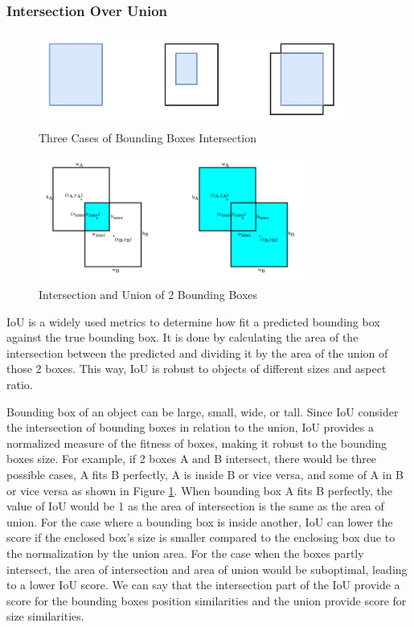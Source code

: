   \subsubsection{Intersection Over Union}
   \begin{figure}[p]
        \centering
        \includegraphics[width=0.9\textwidth]{figures/iou-intersect.png}
        \caption{Three Cases of Bounding Boxes Intersection}
        \label{fig:intersections-iou}
    \end{figure}
    \begin{figure}[p]
        \centering
        \includegraphics[width=0.8\textwidth]{figures/inter-union.png}
        \caption{Intersection and Union of 2 Bounding Boxes}
        \label{fig:inter-union}
    \end{figure}
  

  IoU is a widely used metrics to determine how fit a predicted bounding box against the true bounding box.
  It is done by calculating the area of the intersection between the predicted and dividing it by the area of the
  union of those 2 boxes. 
  This way, IoU is robust to objects of different sizes and aspect ratio. 

  Bounding box of an object can be large, small, wide, or tall.
  Since IoU consider the intersection of bounding boxes in relation to the union,
  IoU provides a normalized measure of the fitness of boxes, making it robust 
  to the bounding boxes size. For example, if 2 boxes A and B intersect, there would be
  three possible cases, A fits B perfectly, A is inside B or vice versa, and some of A in B or vice versa as shown in Figure \ref{fig:intersections-iou}.
  When bounding box A fits B perfectly, the value of IoU would be 1 as the area of intersection is the same as the area of union.
  For the case where a bounding box is inside another, IoU can lower the score if the enclosed box's size is smaller compared to
  the enclosing box due to the normalization by the union area.
  For the case when the boxes partly intersect, the area of intersection and area of union would be suboptimal, leading to a lower IoU score. 
  We can say that the intersection part of the IoU provide a score for the bounding boxes position similarities and the 
  union provide score for size similarities.

